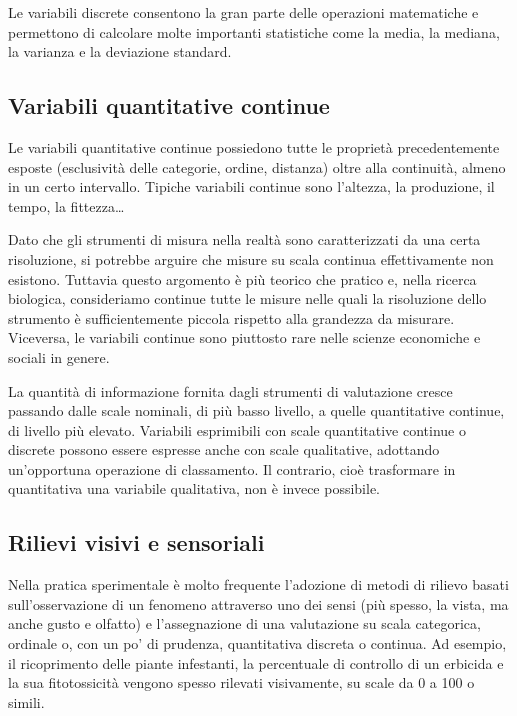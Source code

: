 \documentclass[a4paper,12pt,oneside]{book}
\theoremstyle{definition}
\theoremstyle{definition}
\theoremstyle{definition}
\theoremstyle{remark}
\begin{document}
Le variabili discrete consentono la gran parte delle operazioni
matematiche e permettono di calcolare molte importanti statistiche come
la media, la mediana, la varianza e la deviazione standard.

\subsection{Variabili quantitative
continue}\label{variabili-quantitative-continue}

Le variabili quantitative continue possiedono tutte le proprietà
precedentemente esposte (esclusività delle categorie, ordine, distanza)
oltre alla continuità, almeno in un certo intervallo. Tipiche variabili
continue sono l'altezza, la produzione, il tempo, la fittezza\ldots{}

Dato che gli strumenti di misura nella realtà sono caratterizzati da una
certa risoluzione, si potrebbe arguire che misure su scala continua
effettivamente non esistono. Tuttavia questo argomento è più teorico che
pratico e, nella ricerca biologica, consideriamo continue tutte le
misure nelle quali la risoluzione dello strumento è sufficientemente
piccola rispetto alla grandezza da misurare. Viceversa, le variabili
continue sono piuttosto rare nelle scienze economiche e sociali in
genere.

La quantità di informazione fornita dagli strumenti di valutazione
cresce passando dalle scale nominali, di più basso livello, a quelle
quantitative continue, di livello più elevato. Variabili esprimibili con
scale quantitative continue o discrete possono essere espresse anche con
scale qualitative, adottando un'opportuna operazione di classamento. Il
contrario, cioè trasformare in quantitativa una variabile qualitativa,
non è invece possibile.

\subsection{Rilievi visivi e
sensoriali}\label{rilievi-visivi-e-sensoriali}

Nella pratica sperimentale è molto frequente l'adozione di metodi di
rilievo basati sull'osservazione di un fenomeno attraverso uno dei sensi
(più spesso, la vista, ma anche gusto e olfatto) e l'assegnazione di una
valutazione su scala categorica, ordinale o, con un po' di prudenza,
quantitativa discreta o continua. Ad esempio, il ricoprimento delle
piante infestanti, la percentuale di controllo di un erbicida e la sua
fitotossicità vengono spesso rilevati visivamente, su scale da 0 a 100 o
simili.
\end{document}

